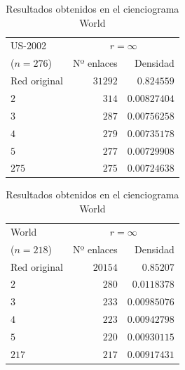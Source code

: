 \documentclass[10pt,a4paper,spanish]{article}
\numberwithin{equation}{section} %
\numberwithin{figure}{section} %
\numberwithin{table}{section} %
\begin{document}
\begin{table}[!h]
\begin{minipage}{0.5\textwidth}
\centering
\begin{tabular}{lrr}
\hline
 US-2002 & \multicolumn{2}{c}{$r = \infty$} \\
($n=276$)   &   Nº enlaces &    Densidad \\
\hline
 Red original                     &               $31292$ & $0.824559$ \\
 $2$                                &                 $314$ & $0.00827404$  \\
 $3$                                &                 $287$ & $0.00756258$  \\
 $4$                                &                 $279$ & $0.00735178$  \\
 $5$                                &                 $277$ & $0.00729908$  \\
 $275$                              &                 $275$ & $0.00724638$  \\
\hline
\end{tabular}
\caption{Resultados obtenidos en el cienciograma United\_States-2002}
\label{unitedstates2002}
\end{minipage}
\begin{minipage}{0.5\textwidth}
\centering
\begin{tabular}{lrr}
\hline
 World & \multicolumn{2}{c}{$r = \infty$} \\
($n=218$)   &   Nº enlaces &    Densidad \\
\hline
 Red original        &               $20154$ & $0.85207$ \\
 $2$                   &                 $280$ & $0.0118378$  \\
 $3$                   &                 $233$ & $0.00985076$  \\
 $4$                   &                 $223$ & $0.00942798$  \\
 $5$                   &                 $220$ & $0.00930115$  \\
 $217$                 &                 $217$ & $0.00917431$  \\
\hline
\end{tabular}
\caption{Resultados obtenidos en el cienciograma World}
\label{world}
\end{minipage}
\end{table}
\end{document}
